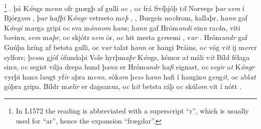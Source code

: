  \footnote{In L1572 the reading is abbreviated with a superscript \enquote{r}, which is usually used for \enquote{ar}, hence the expansion \enquote{frægdar}.} .   þá K\textit{ón}gs m\textit{enn} ofr gnægþ af gulli
o\textit{c} , 
o\textit{c}   frá Svíþjóþ  
 t\textit{il} Norvegs  
þ\textit{ar} s\textit{em} í Bjỏrg\textit{om} , 
þ\textit{ar} h\textit{afþi} K\textit{óngr} vetrseto m\textit{eþ}   ,  ,   Burgeis no\textit{ck}rom,  
  kallaþr, 
h\textit{ann} gaf K\textit{óngi} m\textit{ar}ga   gripi o\textit{c} sva m\textit{ỏnnom} h\textit{an}s; h\textit{ann} gaf
Hróm\textit{undi} ein\textit{n}  ra\textit{ck}a,   viti b\textit{or}in\textit{n}, s\textit{em} m\textit{aþr}, o\textit{c}
skjótr s\textit{em}  ỏr, o\textit{c} hit  mesta
g\textit{er}semi   ,   v\textit{ar} . Hróm\textit{undr} gaf Gnúþa   hríng af betsta gulli, oc  v\textit{ar} talat   h\textit{ann}  or haugi Þráins, o\textit{c}  vóg   v\textit{it} ij m\textit{er}cr  sylfors; 
þ\textit{ess}a gjỏf ỏfundaþi Vole hyrþm\textit{aþr} K\textit{ón}gs,   kémor a\textit{t} máli v\textit{it} Bíld félaga
sin\textit{n}, o\textit{c} segist vilja drepa  hund
þ\textit{an}\textit{n} er Hróm\textit{undr} h\textit{afi} eignast,
o\textit{c} s\textit{egir} a\textit{t} K\textit{óngr}  vyrþi  han\textit{n} l\textit{an}gt yf\textit{ir} aþra m\textit{enn},  
 sỏk\textit{om}  þ\textit{ess}  h\textit{ann} hafi í haugin\textit{n} g\textit{en}g\textit{it}, 
 oc  abl\textit{at}  góþra gripa. 
 Bíldr m\textit{ælir}  er dagsan\textit{n}a, o\textit{c} h\textit{it} betsta ráþ   o\textit{c} skúl\textit{om} vit í nótt  . 
 \pend 
 \endnumbering  

